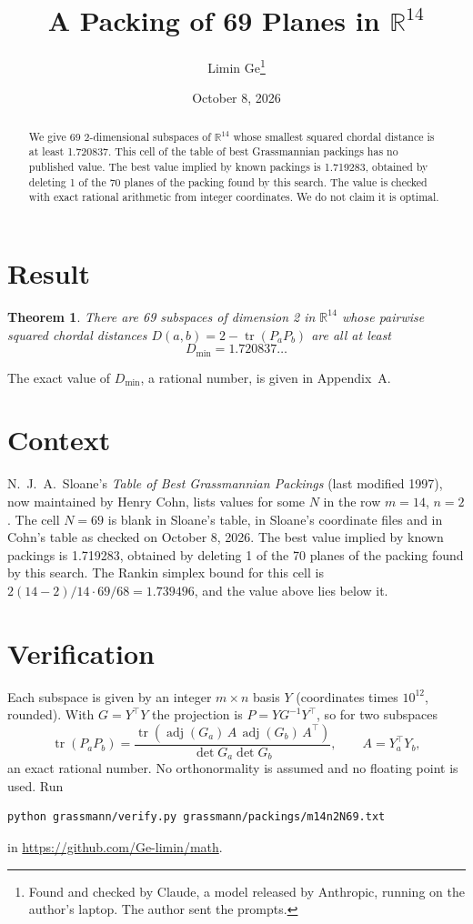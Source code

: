 \documentclass[11pt,a4paper]{article}
\title{A Packing of 69 Planes in $\mathbb{R}^{14}$}
\author{Limin Ge\thanks{Found and checked by Claude, a model released by Anthropic, running on the author's laptop. The author sent the prompts.}}
\date{October 8, 2026}
\newtheorem*{theorem}{Theorem}
\begin{document}
\maketitle
\begin{abstract}
We give 69 2-dimensional subspaces of $\mathbb{R}^{14}$ whose smallest squared chordal distance is at least 1.720837. This cell of the table of best Grassmannian packings has no published value. The best value implied by known packings is 1.719283, obtained by deleting 1 of the 70 planes of the packing found by this search. The value is checked with exact rational arithmetic from integer coordinates. We do not claim it is optimal.
\end{abstract}

\section{Result}
\begin{theorem}
There are 69 subspaces of dimension 2 in $\mathbb{R}^{14}$ whose pairwise squared chordal distances $D(a,b) = 2 - \operatorname{tr}(P_aP_b)$ are all at least
\[ D_{\min} = 1.720837\ldots \]
\end{theorem}
The exact value of $D_{\min}$, a rational number, is given in Appendix~A.


\section{Context}
N.~J.~A.~Sloane's \emph{Table of Best Grassmannian Packings} (last modified 1997), now maintained by Henry Cohn, lists values for some $N$ in the row $m=14$, $n=2$. The cell $N=69$ is blank in Sloane's table, in Sloane's coordinate files and in Cohn's table as checked on October 8, 2026. The best value implied by known packings is 1.719283, obtained by deleting 1 of the 70 planes of the packing found by this search. The Rankin simplex bound for this cell is $2(14-2)/14\cdot 69/68 = 1.739496$, and the value above lies below it.


\section{Verification}
Each subspace is given by an integer $m\times n$ basis $Y$ (coordinates times $10^{12}$, rounded). With $G=Y^\top Y$ the projection is $P=YG^{-1}Y^\top$, so for two subspaces
\[ \operatorname{tr}(P_aP_b)=\frac{\operatorname{tr}(\operatorname{adj}(G_a)\,A\,\operatorname{adj}(G_b)\,A^\top)}{\det G_a\det G_b},\qquad A=Y_a^\top Y_b, \]
an exact rational number. No orthonormality is assumed and no floating point is used. Run
\begin{verbatim}
python grassmann/verify.py grassmann/packings/m14n2N69.txt
\end{verbatim}
in \url{https://github.com/Ge-limin/math}.
\end{document}
